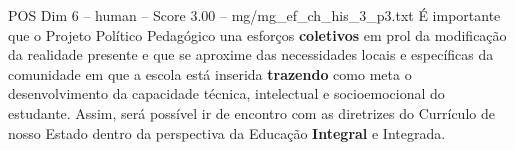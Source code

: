\begin{textsample}{POS Dim 6 – human – Score 3.00 – mg/mg\_ef\_ch\_his\_3\_p3.txt}  \label{ex:f6_pos_017}
É importante que o Projeto Político Pedagógico una esforços \textbf{coletivos} em prol da modificação da realidade presente e que se aproxime das necessidades locais e específicas da comunidade em que a escola está inserida \textbf{trazendo} como meta o desenvolvimento da capacidade técnica, intelectual e socioemocional do estudante.
Assim, será possível ir de encontro com as diretrizes do Currículo de nosso Estado dentro da perspectiva da Educação \textbf{Integral} e Integrada.

\end{textsample}

